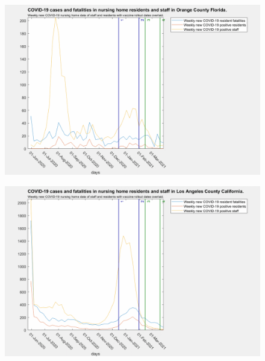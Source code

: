 \documentclass[twoside]{article}
\begin{document}
\begin{multicols}{2}
\begin{figure}[H]
	\includegraphics[width=\linewidth]{images/orange_nursing_home_with_vaccine.png}
	\caption{}
	\label{fig:images/orange_nursing_home_with_vaccineLabel}
\end{figure}

\begin{figure}[H]
	\includegraphics[width=\linewidth]{images/losangeles_nursing_home_with_vaccine.png}
	\caption{}
	\label{fig:images/losangeles_nursing_home_with_vaccineLabel}
\end{figure}


\end{multicols}
\end{document}
